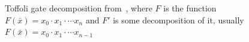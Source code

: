 \documentclass[paper]{ieice}
\providecommand{\DIFaddend}{} %
\DeclareRobustCommand{\DIFaddend}{\DIFOaddend \let\includegraphics\DIFOincludegraphics} %
\begin{document}
{\DIFaddend \begin{figure}[tbp]
    \centering
    \caption{Toffoli gate decomposition from~\cite{bib-rtof-maslov}, where $F$ is the function $F(\bar{x})=x_0 \cdot x_1 \cdot \cdots x_n$ and $F'$ is some decomposition of it, usually $F(\bar{x})=x_0 \cdot x_1 \cdot \cdots x_{n-1}$}
    \label{fig-maslov-decomp}
\end{figure}


}
\end{document}
